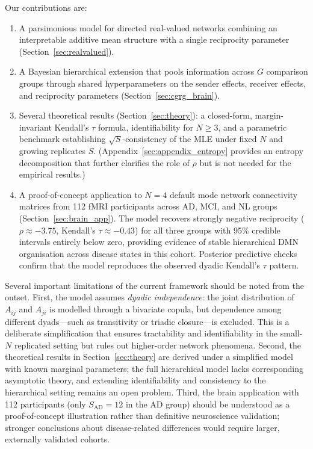 \documentclass[12pt]{article}
\begin{document}
Our contributions are:
\begin{enumerate}
\item A parsimonious model for directed real-valued networks combining an
  interpretable additive mean structure with a single reciprocity parameter
  (Section~\ref{sec:realvalued}).
\item A Bayesian hierarchical extension that pools information across $G$
  comparison groups through shared hyperparameters on the sender effects,
  receiver effects, and reciprocity parameters
  (Section~\ref{sec:cgrg_brain}).
\item Several theoretical results (Section~\ref{sec:theory}): a closed-form,
  margin-invariant Kendall's $\tau$ formula, identifiability for $N \geq 3$,
  and a parametric benchmark establishing $\sqrt{S}$-consistency of the MLE
  under fixed $N$ and growing replicates $S$.  (Appendix~\ref{sec:appendix_entropy}
  provides an entropy decomposition that further clarifies the role of $\rho$
  but is not needed for the empirical results.)
\item A proof-of-concept application to $N = 4$ default mode network
  connectivity matrices from 112 fMRI participants across AD, MCI, and NL
  groups (Section~\ref{sec:brain_app}).  The model recovers strongly negative
  reciprocity ($\rho \approx -3.75$, Kendall's $\tau \approx -0.43$) for
  all three groups with 95\% credible intervals entirely below zero,
  providing evidence of stable hierarchical DMN organisation across disease
  states in this cohort.  Posterior predictive checks confirm that the model
  reproduces the observed dyadic Kendall's $\tau$ pattern.
\end{enumerate}

Several important limitations of the current framework should be noted from
the outset.  First, the model assumes \emph{dyadic independence}: the joint
distribution of $A_{ij}$ and $A_{ji}$ is modelled through a bivariate copula,
but dependence among different dyads---such as transitivity or triadic
closure---is excluded.  This is a deliberate simplification that ensures
tractability and identifiability in the small-$N$ replicated setting but
rules out higher-order network phenomena.  Second, the theoretical results
in Section~\ref{sec:theory} are derived under a simplified model with known
marginal parameters; the full hierarchical model lacks corresponding asymptotic
theory, and extending identifiability and consistency to the hierarchical
setting remains an open problem.  Third, the brain application with 112
participants (only $S_{\mathrm{AD}} = 12$ in the AD group) should be
understood as a proof-of-concept illustration rather than definitive
neuroscience validation; stronger conclusions about disease-related differences
would require larger, externally validated cohorts.
\end{document}
